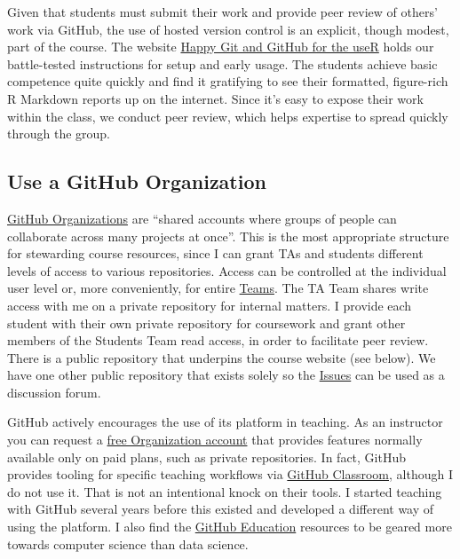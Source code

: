 \documentclass[
]{book}
\begin{document}
Given that students must submit their work and provide peer review of others' work via GitHub, the use of hosted version control is an explicit, though modest, part of the course. The website \href{http://happygitwithr.com}{Happy Git and GitHub for the useR} holds our battle-tested instructions for setup and early usage. The students achieve basic competence quite quickly and find it gratifying to see their formatted, figure-rich R Markdown reports up on the internet. Since it's easy to expose their work within the class, we conduct peer review, which helps expertise to spread quickly through the group.

\subsection{Use a GitHub Organization}\label{use-a-github-organization}

\href{https://help.github.com/articles/differences-between-user-and-organization-accounts/}{GitHub Organizations} are ``shared accounts where groups of people can collaborate across many projects at once''. This is the most appropriate structure for stewarding course resources, since I can grant TAs and students different levels of access to various repositories. Access can be controlled at the individual user level or, more conveniently, for entire \href{https://help.github.com/articles/setting-up-teams/}{Teams}. The TA Team shares write access with me on a private repository for internal matters. I provide each student with their own private repository for coursework and grant other members of the Students Team read access, in order to facilitate peer review. There is a public repository that underpins the course website (see below). We have one other public repository that exists solely so the \href{https://github.com/STAT545-UBC/Discussion/issues}{Issues} can be used as a discussion forum.

GitHub actively encourages the use of its platform in teaching. As an instructor you can request a \href{https://help.github.com/articles/discounted-organization-accounts/}{free Organization account} that provides features normally available only on paid plans, such as private repositories. In fact, GitHub provides tooling for specific teaching workflows via \href{https://classroom.github.com/}{GitHub Classroom}, although I do not use it. That is not an intentional knock on their tools. I started teaching with GitHub several years before this existed and developed a different way of using the platform. I also find the \href{https://education.github.com}{GitHub Education} resources to be geared more towards computer science than data science.
\end{document}

